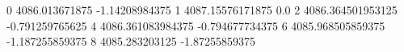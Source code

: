 0 4086.013671875 -1.14208984375
1 4087.15576171875 0.0
2 4086.364501953125 -0.791259765625
4 4086.361083984375 -0.794677734375
6 4085.968505859375 -1.187255859375
8 4085.283203125 -1.87255859375
